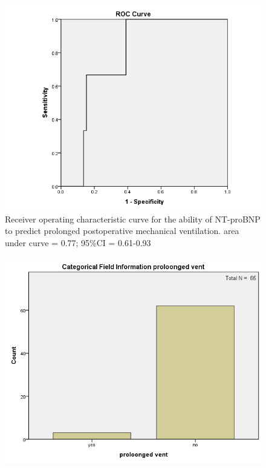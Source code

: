 \documentclass[14pt,a4paper,onecolumn]{extarticle}
\begin{document}
\clearpage
\begin{figure}
    \centering
    \includegraphics[scale=0.7]{../images/roc_vent.png}
    \small\caption{Receiver operating characteristic curve for the ability of NT-proBNP to predict prolonged postoperative mechanical ventilation.  area under curve = 0.77; 95\%CI = 0.61-0.93}
    \label{}
\end{figure}

\clearpage
\begin{figure}
    \centering
    \includegraphics[scale=0.7]{../images/cat_vent.png}
    \small\caption{}
    \label{}
\end{figure}
\end{document}
